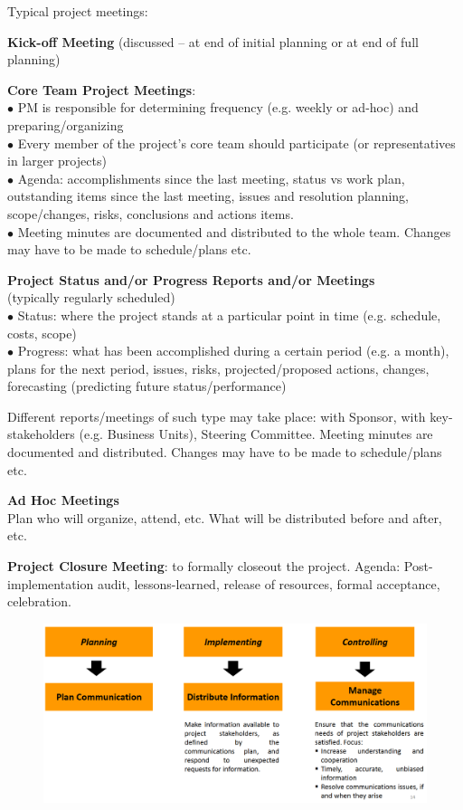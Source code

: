 \documentclass[]{project_plan}
\newcommand{\bulletPoint}{\hspace{-3.1pt}$\bullet$ \hspace{5pt}}
\begin{document}
\newpage

Typical project meetings:

\textbf{Kick-off Meeting} (discussed – at end of initial planning or at end of full planning)

\textbf{Core Team Project Meetings}:\\
\bulletPoint PM is responsible for determining frequency (e.g. weekly or ad-hoc) and preparing/organizing\\
\bulletPoint Every member of the project’s core team should participate (or representatives in larger projects)\\
\bulletPoint Agenda: accomplishments since the last meeting, status vs work plan, outstanding items since the last meeting, issues and
resolution planning, scope/changes, risks, conclusions and actions items.\\
\bulletPoint Meeting minutes are documented and distributed to the whole team. Changes may have to be made to schedule/plans etc.

\textbf{Project Status and/or Progress Reports and/or Meetings}\\
(typically regularly scheduled)\\
\bulletPoint Status: where the project stands at a particular point in time (e.g. schedule, costs, scope)\\
\bulletPoint Progress: what has been accomplished during a certain period (e.g. a month), plans for the next period, issues, risks,
projected/proposed actions, changes, forecasting (predicting future status/performance)

Different reports/meetings of such type may take place: with Sponsor, with key-stakeholders (e.g. Business Units), Steering Committee.
Meeting minutes are documented and distributed. Changes may have to be made to schedule/plans etc.

\textbf{Ad Hoc Meetings}\\
Plan who will organize, attend, etc. What will be distributed before and after, etc.

\textbf{Project Closure Meeting}: to formally closeout the project. Agenda: Post-implementation audit, lessons-learned,
release of resources, formal acceptance, celebration.

\begin{figure}[h!]
  \centering
  \includegraphics[width=\linewidth]{communications_stages.png}
\end{figure}
\end{document}
